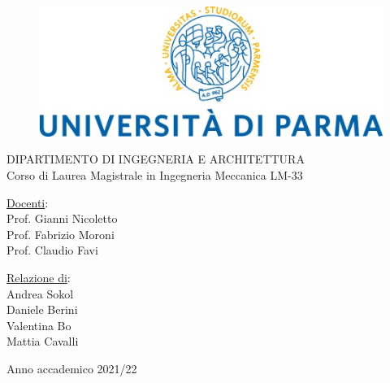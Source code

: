 \begin{center}
    \begin{figure}[h]
        \centering
        \includegraphics[scale=0.7]{Immagini/logo.jpg}
      
    \end{figure}
    \vspace{0.5cm}
    \centering
    DIPARTIMENTO DI INGEGNERIA E ARCHITETTURA
\\
\vspace{0.5cm}
\centering
Corso di Laurea Magistrale in Ingegneria Meccanica LM-33\\
\vspace{0.5cm}
\end{center}
\vspace{1cm}
\underline{Docenti}:\\
Prof. Gianni Nicoletto\\
Prof. Fabrizio Moroni\\
Prof. Claudio Favi\\
\begin{flushright}
\underline{Relazione di}: \\
Andrea Sokol\\
Daniele Berini\\
Valentina Bo\\
Mattia Cavalli\\
\end{flushright}
\vspace{0.5cm}
\begin{center}
   Anno accademico 2021/22 
\end{center}